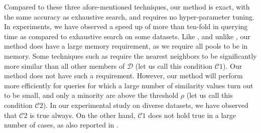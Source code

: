 \documentclass[sigconf, anonymous, review]{acmart}
\begin{document}
Compared to these three afore-mentioned techniques, our method is exact, with the same accuracy as exhaustive search, and requires no hyper-parameter tuning. In experiments, we have observed a speed up of more than ten-fold in querying time as compared to exhaustive search on some datasets. Like \cite{Shi2014}, and unlike \cite{Engels2021, Iscen2018}, our method does have a large memory requirement, as we require all pools to be in memory. Some techniques such as \cite{Engels2021} require the nearest neighbors to be significantly more similar than all other members of $\mathcal{D}$ (let us call this condition $\mathscr{C}1$). Our method does not have such a requirement. However, our method will perform more efficiently for queries for which a large number of similarity values turn out to be small, and only a minority are above the threshold $\rho$ (let us call this condition $\mathscr{C}2$). In our experimental study on diverse datasets, we have observed that $\mathscr{C}2$ is  true always. On the other hand, $\mathscr{C}1$ does not hold true in a large number of cases, as also reported in \cite[Sec. 5.3]{Engels2021}.
\end{document}
